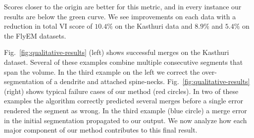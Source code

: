 Scores closer to the origin are better for this metric, and in every instance our results are below the green curve.
We see improvements on each data with a reduction in total VI score of $10.4\%$ on the Kasthuri data and $8.9\%$ and $5.4\%$ on the FlyEM datasets.

Fig.~\ref{fig:qualitative-results} (left) shows successful merges on the Kasthuri dataset. 
Several of these examples combine multiple consecutive segments that span the volume.
In the third example on the left we correct the over-segmentation of a dendrite and attached spine-necks.
Fig.~\ref{fig:qualitative-results} (right) shows typical failure cases of our method (red circles).
In two of these examples the algorithm correctly predicted several merges before a single error rendered the segment as wrong.
In the third example (blue circle) a merge error in the initial segmentation propagated to our output.
We now analyze how each major component of our method contributes to this final result.


